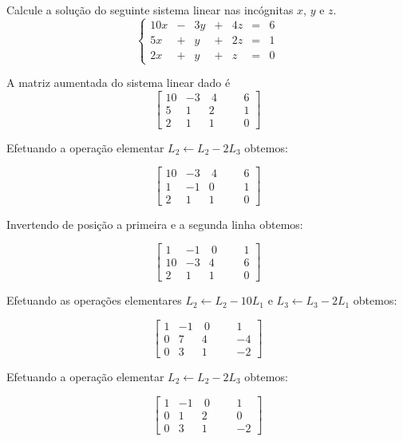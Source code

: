\begin{problem}
Calcule a solução do seguinte sistema linear nas incógnitas $x$, $y$ e $z$.
$$\left\{\begin{array}{rrrrrrr}
10x & - & 3y & + & 4z & = & 6 \\
 5x & + &  y & + & 2z & = & 1 \\
 2x & + &  y & + &  z & = & 0 \end{array}\right. $$
\end{problem}
\begin{solution}
A matriz aumentada do sistema linear dado é
$$ \left[\begin{array}{rrrr|rr}
 10 &  -3 & \  4 & & &   6  \\
	5 &   1 &    2 & & &   1  \\ 
	2 &   1 &    1 & & &   0  \end{array}\right] $$

Efetuando a operação elementar $L_2 \leftarrow L_2 - 2L_3$ obtemos:

$$ \left[\begin{array}{rrrr|rr}
 10 &  -3 & \  4 & & &   6  \\
	1 &  -1 &    0 & & &   1  \\ 
	2 &   1 &    1 & & &   0  \end{array}\right] $$

Invertendo de posição a primeira e a segunda linha obtemos:

$$ \left[\begin{array}{rrrr|rr}
	1 &  -1 & \  0 & & &   1  \\ 
 10 &  -3 &    4 & & &   6  \\
	2 &   1 &    1 & & &   0  \end{array}\right] $$

Efetuando as operações elementares $L_2 \leftarrow L_2 - 10L_1$ e $L_3 \leftarrow L_3 - 2L_1$ obtemos:

$$ \left[\begin{array}{rrrr|rr}
	1 &  -1 & \  0 & & &   1  \\ 
	0 &   7 &    4 & & &  -4  \\
	0 &   3 &    1 & & &  -2  \end{array}\right] $$

Efetuando a operação elementar $L_2 \leftarrow L_2 - 2L_3$ obtemos:

$$ \left[\begin{array}{rrrr|rr}
	1 &  -1 & \  0 & & &   1  \\ 
	0 &   1 &    2 & & &   0  \\
	0 &   3 &    1 & & &  -2  \end{array}\right] $$


\end{solution}
